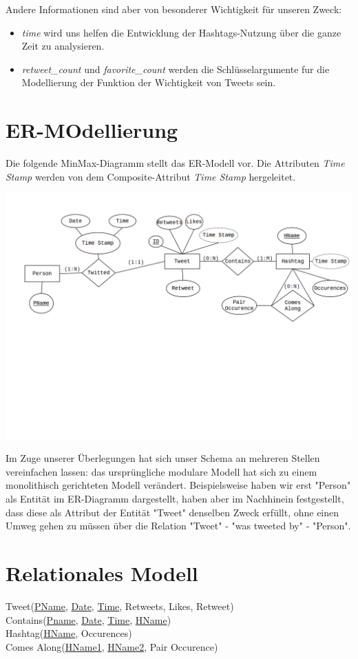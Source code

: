 \documentclass[paper=a4, english, ngerman, romanian]{scrartcl}
\begin{document}
		Andere Informationen sind aber von besonderer Wichtigkeit für unseren Zweck:
		
		\begin{itemize}
		\item \textit{time} wird uns helfen die Entwicklung der Hashtags-Nutzung über die ganze Zeit zu analysieren. 
		\item \textit{retweet\_count} und \textit{favorite\_count} werden die Schlüsselargumente fur die Modellierung der Funktion der Wichtigkeit von Tweets sein.
		\end{itemize}

\section{ER-MOdellierung}
	
	Die folgende MinMax-Diagramm stellt das ER-Modell vor. Die Attributen \textit{Time Stamp} werden von dem Composite-Attribut \textit{Time Stamp} hergeleitet.
	
	\includegraphics[scale=0.8]{MinMax_Diagram.png}
	
Im Zuge unserer Überlegungen hat sich unser Schema an mehreren Stellen vereinfachen lassen: das ursprüngliche modulare Modell hat sich zu einem monolithisch gerichteten Modell verändert. Beispielsweise haben wir erst "Person" als Entität im ER-Diagramm dargestellt, haben aber im Nachhinein festgestellt, dass diese als Attribut der Entität "Tweet" denselben Zweck erfüllt, ohne einen Umweg gehen zu müssen über die Relation "Tweet" - "was tweeted by" - "Person".  

\section{Relationales Modell}

Tweet(\underline{PName}, \underline{Date}, \underline{Time}, Retweets, Likes, Retweet)\\
Contains(\underline{Pname}, \underline{Date}, \underline{Time}, \underline{HName})\\
Hashtag(\underline{HName}, Occurences)\\
Comes Along(\underline{HName1}, \underline{HName2}, Pair Occurence)   

	
\end{document}
